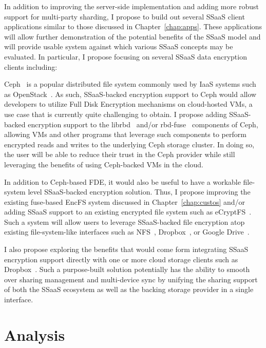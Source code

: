 In addition to improving the server-side implementation and adding
more robust support for multi-party sharding, I propose to build out
several SSaaS client applications similar to those discussed in
Chapter~\ref{chap:apps}. These applications will allow further
demonstration of the potential benefits of the SSaaS model and will
provide usable system against which various SSaaS concepts may be
evaluated. In particular, I propose focusing on several SSaaS data
encryption clients including:

\begin{packed_desc}
\item[Ceph Encryption Support:] Ceph~\cite{ceph} is a popular
  distributed file system commonly used by IaaS systems such as
  OpenStack~\cite{openstack}. As such, SSaaS-backed encryption support
  to Ceph would allow developers to utilize Full Disk Encryption
  mechanisms on cloud-hosted VMs, a use case that is currently quite
  challenging to obtain. I propose adding SSaaS-backed encryption
  support to the librbd~\cite{ceph-librbd-python, ceph-librbd-src}
  and/or rbd-fuse~\cite{ceph-rbdfuse} components of Ceph, allowing VMs
  and other programs that leverage such components to perform
  encrypted reads and writes to the underlying Ceph storage
  cluster. In doing so, the user will be able to reduce their trust in
  the Ceph provider while still leveraging the benefits of using
  Ceph-backed VMs in the cloud.
\item[File-system Encryption Support:] In addition to Ceph-based FDE,
  it would also be useful to have a workable file-system level
  SSaaS-backed encryption solution. Thus, I propose improving the
  existing fuse-based EncFS system discussed in
  Chapter~\ref{chap:custos} and/or adding SSaaS support to an existing
  encrypted file system such as eCryptFS~\cite{ecryptfs}. Such a
  system will allow users to leverage SSaaS-backed file encryption
  atop existing file-system-like interfaces such as
  NFS~\cite{sandberg1985}, Dropbox~\cite{dropbox}, or Google
  Drive~\cite{google-drive}.
\item[Cloud Encryption Support:] I also propose exploring the benefits
  that would come form integrating SSaaS encryption support directly
  with one or more cloud storage clients such as
  Dropbox~\cite{dropbox}. Such a purpose-built solution potentially
  has the ability to smooth over sharing management and multi-device
  sync by unifying the sharing support of both the SSaaS ecosystem as
  well as the backing storage provider in a single interface.
\end{packed_desc}

\section{Analysis}

